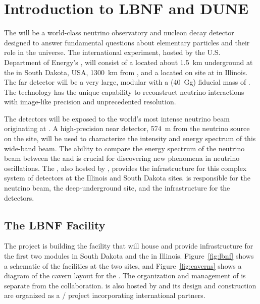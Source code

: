 \chapter{Introduction to LBNF and DUNE}
\label{ch:physics-intro}



The  will be a world-class neutrino observatory and nucleon decay detector designed to answer fundamental questions about elementary particles and their role in the universe. The international  experiment, hosted by the U.S. Department of Energy's , will consist of a  located about \SI{1.5}{km} underground at the  in South Dakota, USA, \SI{1300}{\km} from , and a  located on site at  in Illinois. The far detector will be a very large, modular  with a \fdfiducialmass (\SI{40}{\giga\gram}) fiducial mass of . The  technology 
has the unique capability to reconstruct neutrino interactions with image-like precision and unprecedented resolution. 

The  detectors will be exposed to the world's most intense neutrino beam originating at . A high-precision near detector, \SI{574}{m} from the neutrino source on the  site, will be used to characterize the intensity and energy spectrum of this wide-band beam. The ability to compare the energy spectrum of the neutrino beam between the  and 
is crucial for discovering new phenomena in neutrino oscillations. The , also hosted by , provides the infrastructure for this complex system of detectors at the Illinois and South Dakota sites.  is responsible for the neutrino beam, the deep-underground site, and the infrastructure for the  detectors. 

\section{The LBNF Facility}
\label{sec:physics-intro-lbnf}

The  project is building the facility that will house and provide infrastructure for the first two   modules  in South Dakota  and the  in Illinois.  Figure~\ref{fig:lbnf} shows
a schematic of the facilities at the two sites, and Figure~\ref{fig:caverns} shows a diagram of the cavern layout for the .  
The organization and management of  is separate from the  collaboration.  is also hosted by  and its design and construction are organized as a / project incorporating international partners. 

